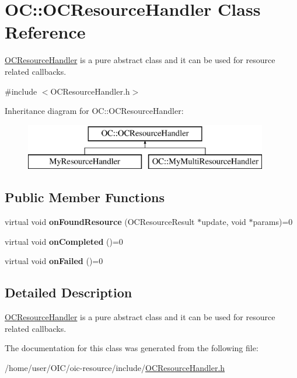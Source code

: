 \hypertarget{classOC_1_1OCResourceHandler}{}\section{O\+C\+:\+:O\+C\+Resource\+Handler Class Reference}
\label{classOC_1_1OCResourceHandler}


\hyperlink{classOC_1_1OCResourceHandler}{O\+C\+Resource\+Handler} is a pure abstract class and it can be used for resource related callbacks.  




{\ttfamily \#include $<$O\+C\+Resource\+Handler.\+h$>$}

Inheritance diagram for O\+C\+:\+:O\+C\+Resource\+Handler\+:\begin{figure}[H]
\begin{center}
\leavevmode
\includegraphics[height=2.000000cm]{classOC_1_1OCResourceHandler}
\end{center}
\end{figure}
\subsection*{Public Member Functions}
\begin{DoxyCompactItemize}
\item 
\hypertarget{classOC_1_1OCResourceHandler_af8e5c805c860206dafab508b732ea802}{}virtual void {\bfseries on\+Found\+Resource} (O\+C\+Resource\+Result $\ast$update, void $\ast$params)=0\label{classOC_1_1OCResourceHandler_af8e5c805c860206dafab508b732ea802}

\item 
\hypertarget{classOC_1_1OCResourceHandler_abf8d4bec38a1f81756f11c3058109498}{}virtual void {\bfseries on\+Completed} ()=0\label{classOC_1_1OCResourceHandler_abf8d4bec38a1f81756f11c3058109498}

\item 
\hypertarget{classOC_1_1OCResourceHandler_a0893d74e2b4ca3024f2e9ad832534642}{}virtual void {\bfseries on\+Failed} ()=0\label{classOC_1_1OCResourceHandler_a0893d74e2b4ca3024f2e9ad832534642}

\end{DoxyCompactItemize}


\subsection{Detailed Description}
\hyperlink{classOC_1_1OCResourceHandler}{O\+C\+Resource\+Handler} is a pure abstract class and it can be used for resource related callbacks. 

The documentation for this class was generated from the following file\+:\begin{DoxyCompactItemize}
\item 
/home/user/\+O\+I\+C/oic-\/resource/include/\hyperlink{OCResourceHandler_8h}{O\+C\+Resource\+Handler.\+h}\end{DoxyCompactItemize}
